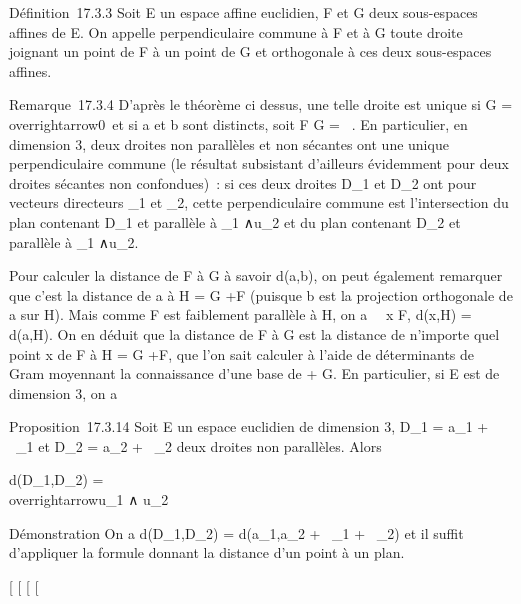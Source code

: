 \documentclass[]{article}
\begin{document}
Définition~17.3.3 Soit E un espace affine euclidien, F et G deux
sous-espaces affines de E. On appelle perpendiculaire commune à F et à G
toute droite joignant un point de F à un point de G et orthogonale à ces
deux sous-espaces affines.

Remarque~17.3.4 D'après le théorème ci dessus, une telle droite est
unique si \overrightarrowF
\bigcap\overrightarrow G =
\\overrightarrow0\
et si a et b sont distincts, soit F \bigcap G = \varnothing~. En particulier, en
dimension 3, deux droites non parallèles et non sécantes ont une unique
perpendiculaire commune (le résultat subsistant d'ailleurs évidemment
pour deux droites sécantes non confondues)~: si ces deux droites
D_1 et D_2 ont pour vecteurs directeurs
\overrightarrowu_1 et
\overrightarrowu_2, cette perpendiculaire
commune est l'intersection du plan contenant D_1 et parallèle à
\overrightarrowu_1
∧\overrightarrow u_2 et du plan contenant
D_2 et parallèle à
\overrightarrowu_1
∧\overrightarrow u_2.

Pour calculer la distance de F à G à savoir d(a,b), on peut également
remarquer que c'est la distance de a à H = G
+\overrightarrow F (puisque b est la projection
orthogonale de a sur H). Mais comme F est faiblement parallèle à H, on a
\forall~~x \in F, d(x,H) = d(a,H). On en déduit que la
distance de F à G est la distance de n'importe quel point x de F à H = G
+, que l'on sait calculer à l'aide
de déterminants de Gram moyennant la connaissance d'une base de
\overrightarrowF +\overrightarrow
G. En particulier, si E est de dimension 3, on a

Proposition~17.3.14 Soit E un espace euclidien de dimension 3,
D_1 = a_1 +
~\overrightarrowu_1 et D_2 =
a_2 + \mathbb{R}~\overrightarrowu_2 deux
droites non parallèles. Alors

d(D_1,D_2) = \Big
 \over
\\overrightarrowu_1
∧\overrightarrow
u_2\

Démonstration On a d(D_1,D_2) =
d(a_1,a_2 +
~\overrightarrowu_1 +
\mathbb{R}~\overrightarrowu_2) et il suffit
d'appliquer la formule donnant la distance d'un point à un plan.

[
[
[
[
\end{document}
